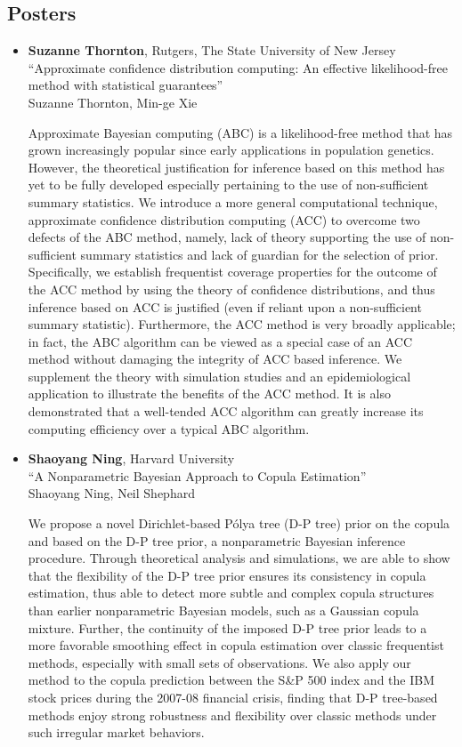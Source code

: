 \subsection*{Posters}
\begin{itemize}
\item \textbf{Suzanne Thornton}, Rutgers, The State University of New Jersey \\
``Approximate confidence distribution computing: An effective likelihood-free method with statistical guarantees'' \\
Suzanne Thornton, Min-ge Xie


Approximate Bayesian computing (ABC) is a likelihood-free method that has grown increasingly popular since early applications in population genetics. However, the theoretical justification for inference based on this method has yet to be fully developed especially pertaining to the use of non-sufficient summary statistics. We introduce a more general computational technique, approximate confidence distribution computing (ACC) to overcome two defects of the ABC method, namely, lack of theory supporting the use of non-sufficient summary statistics and lack of guardian for the selection of prior. Specifically, we establish frequentist coverage properties for the outcome of the ACC method by using the theory of confidence distributions, and thus inference based on ACC is justified (even if reliant upon a non-sufficient summary statistic). Furthermore, the ACC method is very broadly applicable; in fact, the ABC algorithm can be viewed as a special case of an ACC method without damaging the integrity of ACC based inference. We supplement the theory with simulation studies and an epidemiological application to illustrate the benefits of the ACC method. It is also demonstrated that a well-tended ACC algorithm can greatly increase its computing efficiency over a typical ABC algorithm.

\item \textbf{Shaoyang Ning}, Harvard University \\
``A Nonparametric Bayesian Approach to Copula Estimation'' \\
Shaoyang Ning, Neil Shephard


We propose a novel Dirichlet-based P\'olya tree (D-P tree) prior on the copula and based on the D-P tree prior, a nonparametric Bayesian inference procedure. Through theoretical analysis and simulations, we are able to show that the flexibility of the D-P tree prior ensures its consistency in copula estimation, thus able to detect more subtle and complex copula structures than earlier nonparametric Bayesian models, such as a Gaussian copula mixture. Further, the continuity of the imposed D-P tree prior leads to a more favorable smoothing effect in copula estimation over classic frequentist methods, especially with small sets of observations. We also apply our method to the copula prediction between the S\&P 500 index and the IBM stock prices during the 2007-08 financial crisis, finding that D-P tree-based methods enjoy strong robustness and flexibility over classic methods under such irregular market behaviors.


\end{itemize}
